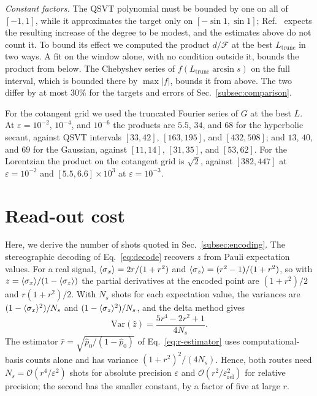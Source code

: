 \emph{Constant factors.}  The QSVT polynomial must be bounded by
one on all of $[-1,1]$, while it approximates the target only on
$[-\sin1,\sin1]$; Ref.~\cite{McArdleGilyenBerta2025} expects the
resulting increase of the degree to be modest, and the estimates
above do not count it.  To bound its effect we computed the product
$d/\mathcal{F}$ at the best $L_{\mathrm{trunc}}$ in two ways.  A
fit on the window alone, with no condition outside it, bounds the
product from below.  The Chebyshev series of
$f(L_{\mathrm{trunc}}\arcsin s)$ on the full interval, which is
bounded there by $\max|f|$, bounds it from above.  The two differ
by at most $30\%$ for the targets and errors of
Sec.~\ref{subsec:comparison}.

For the cotangent grid we used the
truncated Fourier series of $G$ at the best $L$.  At
$\varepsilon=10^{-2}$, $10^{-4}$, and $10^{-6}$ the products are
$5.5$, $34$, and $68$ for the hyperbolic secant, against QSVT
intervals $[33,42]$, $[163,195]$, and $[432,508]$; and $13$, $40$,
and $69$ for the Gaussian, against $[11,14]$, $[31,35]$, and
$[53,62]$.  For the Lorentzian the product on the cotangent grid is
$\sqrt2$, against $[382,447]$ at $\varepsilon=10^{-2}$ and
$[5.5,6.6]\times10^{3}$ at $\varepsilon=10^{-3}$.

\section{Read-out cost}
\label{app:readout}

Here, we derive the number of shots quoted in
Sec.~\ref{subsec:encoding}.  The stereographic decoding of
Eq.~\eqref{eq:decode} recovers $z$ from Pauli expectation values.  For a real signal,
$\langle\sigma_x\rangle=2r/(1+r^2)$ and
$\langle\sigma_z\rangle=(r^2-1)/(1+r^2)$, so with
$z=\langle\sigma_x\rangle/(1-\langle\sigma_z\rangle)$ the partial
derivatives at the encoded point are $(1+r^2)/2$ and $r(1+r^2)/2$.
With $N_s$ shots for each expectation value, the variances are
$(1-\langle\sigma_x\rangle^2)/N_s$ and
$(1-\langle\sigma_z\rangle^2)/N_s$, and the delta method gives
\begin{equation}
	\mathrm{Var}(\hat z)=\frac{5r^4-2r^2+1}{4N_s}.
\end{equation}
The estimator $\hat r=\sqrt{\hat p_0/(1-\hat p_0)}$ of
Eq.~\eqref{eq:r-estimator} uses computational-basis counts alone
and has variance $(1+r^2)^2/(4N_s)$.  Hence, both routes need
$N_s=\mathcal{O}(r^4/\varepsilon^2)$ shots for absolute precision
$\varepsilon$ and
$\mathcal{O}(r^2/\varepsilon_{\mathrm{rel}}^2)$ for relative
precision; the second has the smaller constant, by a factor of
five at large $r$.
